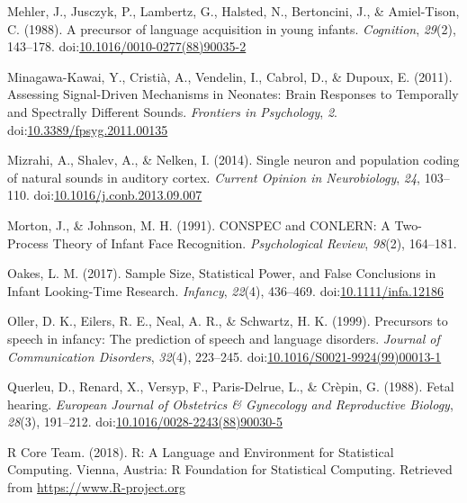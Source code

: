 \documentclass[man]{apa6}
\begin{document}
\hypertarget{ref-mehler_precursor_1988}{}
Mehler, J., Jusczyk, P., Lambertz, G., Halsted, N., Bertoncini, J., \&
Amiel-Tison, C. (1988). A precursor of language acquisition in young
infants. \emph{Cognition}, \emph{29}(2), 143--178.
doi:\href{https://doi.org/10.1016/0010-0277(88)90035-2}{10.1016/0010-0277(88)90035-2}

\hypertarget{ref-minagawa-kawai_assessing_2011}{}
Minagawa-Kawai, Y., Cristià, A., Vendelin, I., Cabrol, D., \& Dupoux, E.
(2011). Assessing Signal-Driven Mechanisms in Neonates: Brain Responses
to Temporally and Spectrally Different Sounds. \emph{Frontiers in
Psychology}, \emph{2}.
doi:\href{https://doi.org/10.3389/fpsyg.2011.00135}{10.3389/fpsyg.2011.00135}

\hypertarget{ref-mizrahi_single_2014}{}
Mizrahi, A., Shalev, A., \& Nelken, I. (2014). Single neuron and
population coding of natural sounds in auditory cortex. \emph{Current
Opinion in Neurobiology}, \emph{24}, 103--110.
doi:\href{https://doi.org/10.1016/j.conb.2013.09.007}{10.1016/j.conb.2013.09.007}

\hypertarget{ref-morton_conspec_1991}{}
Morton, J., \& Johnson, M. H. (1991). CONSPEC and CONLERN: A Two-Process
Theory of Infant Face Recognition. \emph{Psychological Review},
\emph{98}(2), 164--181.

\hypertarget{ref-oakes_sample_2017}{}
Oakes, L. M. (2017). Sample Size, Statistical Power, and False
Conclusions in Infant Looking-Time Research. \emph{Infancy},
\emph{22}(4), 436--469.
doi:\href{https://doi.org/10.1111/infa.12186}{10.1111/infa.12186}

\hypertarget{ref-oller_precursors_1999}{}
Oller, D. K., Eilers, R. E., Neal, A. R., \& Schwartz, H. K. (1999).
Precursors to speech in infancy: The prediction of speech and language
disorders. \emph{Journal of Communication Disorders}, \emph{32}(4),
223--245.
doi:\href{https://doi.org/10.1016/S0021-9924(99)00013-1}{10.1016/S0021-9924(99)00013-1}

\hypertarget{ref-querleu_fetal_1988}{}
Querleu, D., Renard, X., Versyp, F., Paris-Delrue, L., \& Crèpin, G.
(1988). Fetal hearing. \emph{European Journal of Obstetrics \&
Gynecology and Reproductive Biology}, \emph{28}(3), 191--212.
doi:\href{https://doi.org/10.1016/0028-2243(88)90030-5}{10.1016/0028-2243(88)90030-5}

\hypertarget{ref-r_core_team_r:_2018}{}
R Core Team. (2018). R: A Language and Environment for Statistical
Computing. Vienna, Austria: R Foundation for Statistical Computing.
Retrieved from \url{https://www.R-project.org}
\end{document}
